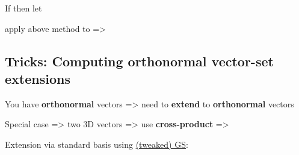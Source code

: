 If  then let 
\begin{itemize}

      \vItem
            apply above method to  =\textgreater{}
      \vItem
\end{itemize}



\subsection*{Tricks: Computing orthonormal vector-set extensions}

You have \textbf{orthonormal} vectors
=\textgreater{} need to \textbf{extend} to \textbf{orthonormal}
vectors

Special case =\textgreater{} two 3D vectors =\textgreater{} use
\textbf{cross-product} =\textgreater{} 

\hSep %

Extension via standard basis
using \underline{\textbar(tweaked) GS}:

